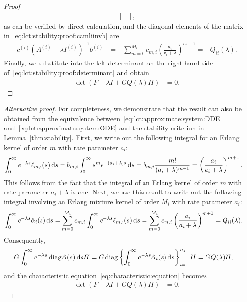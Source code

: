 \begin{proof}
\begin{align}
\begin{bmatrix}
		\end{bmatrix},
	\end{align}
	as can be verified by direct calculation, and the diagonal elements of the matrix in~\eqref{eq:lct:stability:proof:camliinvb} are
	\begin{align}
		c^{(i)} \left(A^{(i)} - \lambda I^{(i)}\right)^{-1} b^{(i)} &= -\sum_{m=0}^{M_i} c_{m, i} \left(\frac{a_i}{a_i + \lambda}\right)^{m+1} = -Q_{ii}(\lambda).
	\end{align}
	Finally, we substitute into the left determinant on the right-hand side of~\eqref{eq:lct:stability:proof:determinant} and obtain
	\begin{align}
		\det(F - \lambda I + G Q(\lambda) H) &= 0.
	\end{align}
\end{proof}
%
\begin{proof}[Alternative proof]
	For completeness, we demonstrate that the result can also be obtained from the equivalence between~\eqref{eq:lct:approximate:system:DDE} and~\eqref{eq:lct:approximate:system:ODE} and the stability criterion in Lemma~\ref{thm:stability}. First, we write out the following integral for an Erlang kernel of order $m$ with rate parameter $a_i$:
	\begin{align}
		\int_0^\infty e^{-\lambda s} \ell_{m, i}(s) \,\mathrm{d} s &= b_{m, i} \int_0^\infty s^m e^{-(a_i + \lambda) s} \,\mathrm{d} s = b_{m, i} \frac{m!}{(a_i + \lambda)^{m+1}} = \left(\frac{a_i}{a_i + \lambda}\right)^{m+1}.
	\end{align}
	This follows from the fact that the integral of an Erlang kernel of order $m$ with rate parameter $a_i + \lambda$ is one. Next, we use this result to write out the following integral involving an Erlang mixture kernel of order $M_i$ with rate parameter $a_i$:
	\begin{align}
		\int_0^\infty e^{-\lambda s} \hat \alpha_i(s) \,\mathrm{d} s &= \sum_{m=0}^{M_i} c_{m, i} \int_0^\infty e^{-\lambda s} \ell_{m, i}(s) \,\mathrm{d} s = \sum_{m=0}^{M_i} c_{m, i} \left(\frac{a_i}{a_i + \lambda}\right)^{m+1} = Q_{ii}(\lambda).
	\end{align}
	Consequently,
	\begin{align}
		G \int_0^\infty e^{-\lambda s} \operatorname{diag} \hat \alpha(s) \,\mathrm{d} s H
		&= G \operatorname{diag} \left\{\int_0^\infty e^{-\lambda s} \hat \alpha_i(s) \,\mathrm{d} s\right\}_{i=1}^{n_z} H = G Q(\lambda) H,
	\end{align}
	and the characteristic equation~\eqref{eq:characteristic:equation} becomes
	\begin{align}
		\det(F - \lambda I + G Q(\lambda) H) &= 0.
	\end{align}
\end{proof}

